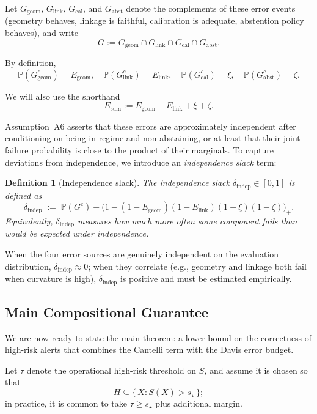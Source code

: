 \documentclass[11pt]{article}
\newcommand{\Prob}{\mathbb{P}}
\newtheorem{definition}{Definition}
\theoremstyle{remark}
\theoremstyle{plain}
\begin{document}
Let $G_{\mathrm{geom}}$, $G_{\mathrm{link}}$, $G_{\mathrm{cal}}$, and $G_{\mathrm{abst}}$ denote the complements of
these error events (geometry behaves, linkage is faithful, calibration is adequate, abstention policy
behaves), and write
\[
G := G_{\mathrm{geom}} \cap G_{\mathrm{link}} \cap G_{\mathrm{cal}} \cap G_{\mathrm{abst}}.
\]

By definition,
\[
\Prob(G_{\mathrm{geom}}^c) = E_{\mathrm{geom}},\quad
\Prob(G_{\mathrm{link}}^c) = E_{\mathrm{link}},\quad
\Prob(G_{\mathrm{cal}}^c) = \xi,\quad
\Prob(G_{\mathrm{abst}}^c) = \zeta.
\]

We will also use the shorthand
\[
E_{\mathrm{sum}} := E_{\mathrm{geom}} + E_{\mathrm{link}} + \xi + \zeta.
\]

Assumption~A6 asserts that these errors are approximately independent after conditioning on
being in-regime and non-abstaining, or at least that their joint failure probability is close to the
product of their marginals. To capture deviations from independence, we introduce an
\emph{independence slack} term:

\begin{definition}[Independence slack]
The independence slack $\delta_{\mathrm{indep}} \in [0,1]$ is defined as
\[
\delta_{\mathrm{indep}}
\;:=\;
\Prob(G^c) -
\bigl(1 - (1-E_{\mathrm{geom}})(1-E_{\mathrm{link}})(1-\xi)(1-\zeta)\bigr)_+.
\]
Equivalently, $\delta_{\mathrm{indep}}$ measures how much more often \emph{some} component fails
than would be expected under independence.
\end{definition}

When the four error sources are genuinely independent on the evaluation distribution, 
$\delta_{\mathrm{indep}}\approx 0$; when they correlate (e.g., geometry and linkage both fail when
curvature is high), $\delta_{\mathrm{indep}}$ is positive and must be estimated empirically.

\subsection{Main Compositional Guarantee}

We are now ready to state the main theorem: a lower bound on the correctness of high-risk alerts
that combines the Cantelli term with the Davis error budget.

Let $\tau$ denote the operational high-risk threshold on $S$, and assume it is chosen so that
\[
H \subseteq \{\,X : S(X) > s_\star\,\};
\]
in practice, it is common to take $\tau \ge s_\star$ plus additional margin.
\end{document}
